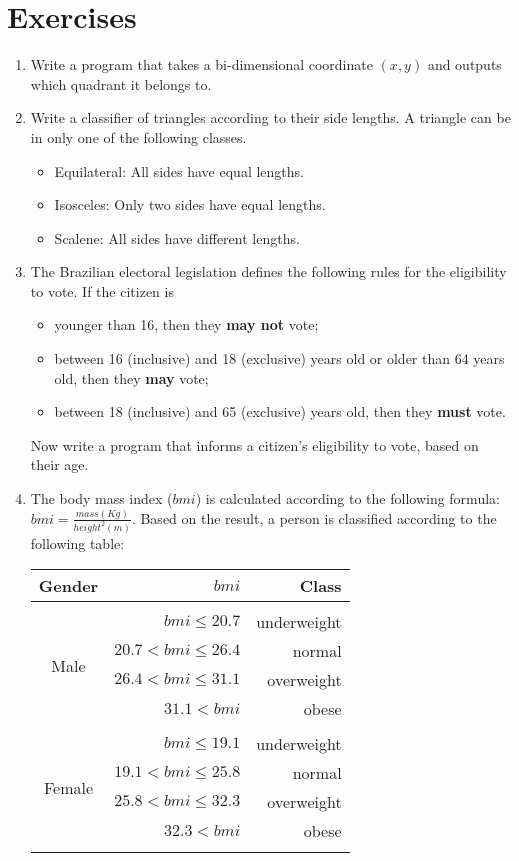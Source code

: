 \documentclass[a4paper]{article}
\begin{document}
	\section{Exercises}
	\begin{enumerate}
		\item Write a program that takes a bi-dimensional coordinate $(x,y)$ and outputs which quadrant it belongs to.
		 
		\item Write a classifier of triangles according to their side lengths. A triangle can be in only one of the following classes.
		\begin{itemize}
			\item Equilateral: All sides have equal lengths.
			\item Isosceles: Only two sides have equal lengths.
			\item Scalene: All sides have different lengths.
		\end{itemize}
	
		\item The Brazilian electoral legislation defines the following rules for the eligibility to vote. If the citizen is
		\begin{itemize}
			\item younger than 16, then they \textbf{may not} vote;
			\item between 16 (inclusive) and 18 (exclusive) years old or older than 64 years old, then they \textbf{may} vote;
			\item between 18 (inclusive) and 65 (exclusive) years old, then they \textbf{must} vote.
		\end{itemize}
		Now write a program that informs a citizen's eligibility to vote, based on their age.
		
		\item The body mass index ($bmi$) is calculated according to the following formula: $bmi = \frac{mass (Kg)}{height^2 (m)}$. Based on the result, a person is classified according to the following table:
		\begin{table}[h!]
			\centering
			\begin{tabular}{crr}
				Gender 					& $bmi$						& Class \\
				\hline\\
				\multirow{4}{*}{Male}	&	$bmi \le 20.7$			& underweight \\
										&	$20.7 < bmi \le 26.4$	& normal \\
										& 	$26.4 < bmi \le 31.1$	& overweight \\
										&	$31.1 < bmi $			& obese \\
				\hline\\
				\multirow{4}{*}{Female}	&	$bmi \le 19.1$			& underweight \\
										&	$19.1 < bmi \le 25.8$	& normal \\
										& 	$25.8 < bmi \le 32.3$	& overweight \\
										&	$32.3 < bmi $			& obese \\
				\hline\\
			\end{tabular}
		\end{table}
	\end{enumerate}
\end{document}
